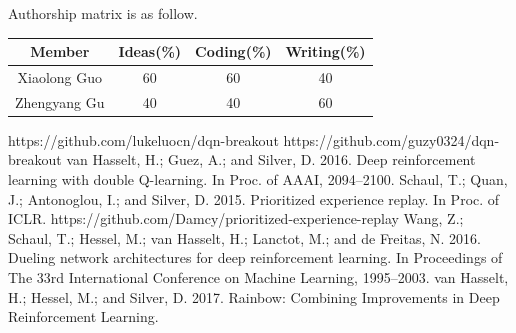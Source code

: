 \documentclass[a4paper, 11pt]{article}
\begin{document}
Authorship matrix is as follow.
\begin{center}
      \begin{tabular}{cccc}
            \hline
            Member       & Ideas(\%) & Coding(\%) & Writing(\%) \\
            \hline
            Xiaolong Guo & 60        & 60         & 40          \\
            Zhengyang Gu & 40        & 40         & 60          \\
            \hline
      \end{tabular}
\end{center}
\begin{thebibliography}{99}
       https://github.com/lukeluocn/dqn-breakout
       https://github.com/guzy0324/dqn-breakout
       van Hasselt, H.; Guez, A.; and Silver, D. 2016. Deep reinforcement learning with double Q-learning. In Proc. of AAAI, 2094–2100.
       Schaul, T.; Quan, J.; Antonoglou, I.; and Silver, D. 2015.
      Prioritized experience replay. In Proc. of ICLR.
       https://github.com/Damcy/prioritized-experience-replay
       Wang, Z.; Schaul, T.; Hessel, M.; van Hasselt, H.; Lanctot,
      M.; and de Freitas, N. 2016. Dueling network architectures for deep reinforcement learning. In Proceedings of The
      33rd International Conference on Machine Learning, 1995–2003.
        van Hasselt, H.; Hessel, M.; and Silver, D. 2017. Rainbow: Combining Improvements in Deep Reinforcement Learning.
\end{thebibliography}
\end{document}
